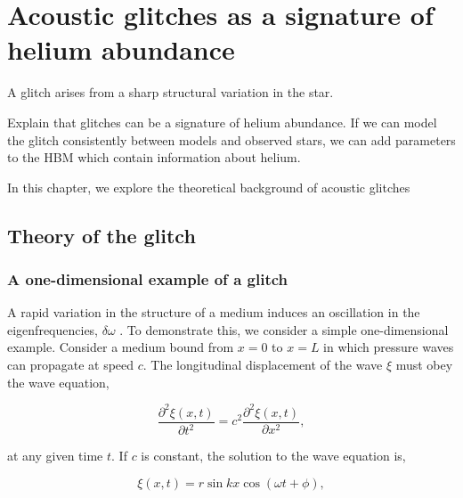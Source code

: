%
%
%
%
%
\chapter[Acoustic glitches]{Acoustic glitches as a signature of helium abundance}\label{chap:glitch}

A glitch arises from a sharp structural variation in the star.

Explain that glitches can be a signature of helium abundance. If we can model the glitch consistently between models and observed stars, we can add parameters to the HBM which contain information about helium.

In this chapter, we explore the theoretical background of acoustic glitches

\section{Theory of the glitch}

\subsection[1D example]{A one-dimensional example of a glitch}

A rapid variation in the structure of a medium induces an oscillation in the eigenfrequencies, \(\delta\omega\) . To demonstrate this, we consider a simple one-dimensional example. Consider a medium bound from \(x=0\) to \(x=L\) in which pressure waves can propagate at speed \(c\). The longitudinal displacement of the wave \(\xi\) must obey the wave equation,

\begin{equation}
    \frac{\partial^2\xi(x, t)}{\partial t^2} = c^2 \frac{\partial^2\xi(x, t)}{\partial x^2},
\end{equation}

at any given time \(t\). If \(c\) is constant, the solution to the wave equation is,

\begin{equation}
    \xi(x, t) = r \sin k x \cos(\omega t + \phi),
\end{equation}


